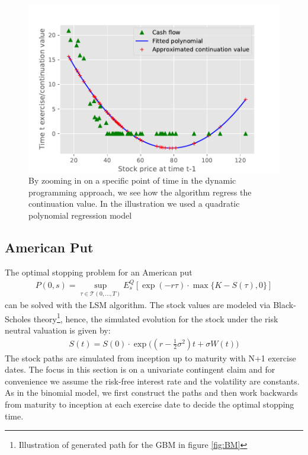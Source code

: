 \begin{figure}[th]
\centering
\includegraphics{Figures/LSMFit1.pdf}
\decoRule
\caption[Polynomial Regression of Continuation Value]{By zooming in on a specific point of time in the dynamic programming approach, we see how the algorithm regress the continuation value. In the illustration we used a quadratic polynomial regression model}
\label{fig:LSM1}
\end{figure}

\subsection{American Put}
The optimal stopping problem for an American put 
\begin{equation*}\label{optimalStopPut}
\begin{split}
P(0,s) = \sup_{\tau \in \mathcal{T}(0,\ldots,T)} E_{s}^Q[ \exp(-r \tau) \cdot \max\{K-S(\tau), 0 \}]
\end{split}
\end{equation*}
can be solved with the LSM algorithm. The stock values are modeled via Black-Scholes theory\footnote{Illustration of generated path for the GBM in figure \ref{fig:BM}}, hence, the simulated evolution for the stock under the risk neutral valuation is given by:
\begin{equation*}
\begin{split}
S(t)=S(0) \cdot \exp \bigg( (r -\frac{1}{2} \sigma^2) t + \sigma W(t) \bigg)
\end{split}
\end{equation*}
The stock paths are simulated from inception up to maturity with N+1 exercise dates. The focus in this section is on a univariate contingent claim and for convenience we assume the risk-free interest rate and the volatility are constants. As in the binomial model, we first construct the paths and then work backwards from maturity to inception at each exercise date to decide the optimal stopping time. \\


